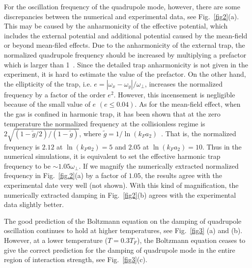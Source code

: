 For the oscillation frequency of the quadrupole mode, however, there are some discrepancies between the numerical and experimental data, see Fig.~\ref{fig2}(a). This may be caused by the anharmonicity of the effective potential, which includes the external potential and additional potential caused by the mean-field or beyond mean-filed effects. Due to the anharmonicity of the external trap, the normalized quadrupole frequency should be increased by multiplying a prefactor which is larger than 1~\cite{Altmeyer2007}. Since the detailed trap anharmonicity is not given in the experiment, it is hard to estimate the value of the prefactor. On the other hand, the ellipticity of the trap, i.e. $e=|\omega_x-\omega_y|/\omega_\bot$, increases the normalized frequency by a factor of the order $e^2$. However, this incensement is negligible because of the small value of $e$ $(e\le0.04)$. As for the mean-field effect, when the gas is confined in harmonic trap, it has been shown that at the zero temperature the normalized frequency at the collisionless regime is $2\sqrt{(1-\widetilde{g}/2)/(1-\widetilde{g})}$, where $\widetilde{g}=1/\ln(k_Fa_{2})$~\cite{Ghosh2002,Vogt2012}. That is, the normalized frequency is $2.12$ at $\ln(k_Fa_{2})=5$ and $2.05$ at $\ln(k_Fa_{2})=10$. Thus in the numerical simulations, it is equivalent to set the effective harmonic trap frequency to be $\sim1.05\omega_\bot$. If we magnify the numerically extracted normalized frequency in Fig.~\ref{fig.2}(a) by a factor of $1.05$, the results agree with the experimental date very well (not shown). With this kind of magnification, the numerically extracted damping in Fig.~\ref{fig2}(b) agrees with the experimental data slightly better.


The good prediction of the Boltzmann equation on the damping of quadrupole oscillation continues to hold at higher temperatures, see Fig.~\ref{fig3} (a) and (b). However, at a lower temperature ($T=0.3T_F$), the Boltzmann equation ceases to give the correct prediction for the damping of quadrupole mode in the entire region of interaction strength, see Fig.~\ref{fig3}(c).







